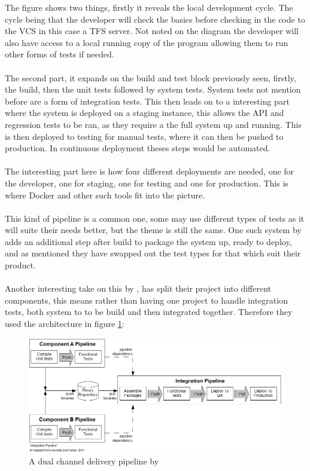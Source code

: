 The figure shows two things, firstly it reveals the local development cycle. The cycle being that the developer will check the basics before checking in the code to the VCS in this case a TFS server. Not noted on the diagram the developer will also have access to a local running copy of the program allowing them to run other forms of tests if needed. 
\\\\
The second part, it expands on the build and test block previously seen, firstly, the build, then the unit tests followed by system tests. System tests not mention before are a form of integration tests. This then leads on to a interesting part where the system is deployed on a staging instance, this allows the API and regression tests to be ran, as they require a the full system up and running. This is then deployed to testing  for manual tests, where it can then be pushed to production. In continuous deployment theses steps would be automated.
\\\\
The interesting part here is how four different deployments are needed, one for the developer, one for staging, one for testing and one for production. This is where Docker and other such tools fit into the picture.
\\\\
This kind of pipeline is a common one, some may use different types of tests as it will suite their needs better, but the theme is still the same. One such system by \cite{zend} adds an additional step after build to package the system up, ready to deploy, and as mentioned they have swapped out the test types for that which suit their product.
\\\\
Another interesting take on this by \cite{codeahoy}, has split their project into different components, this means rather than having one project to handle integration tests, both system to to be build and then integrated together. Therefore they used the architecture in figure \ref{fig:codeahoy}:

\begin{figure}[H]
	\centering
	\includegraphics[scale=0.5]{images/codeahoy.png}
	\caption{A dual channel delivery pipeline by \cite{codeahoy}}
	\label{fig:codeahoy}
\end{figure}

